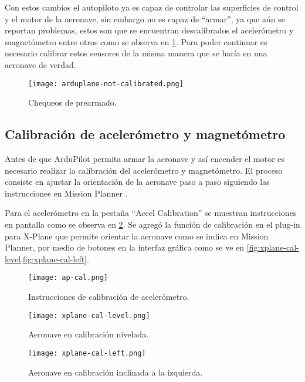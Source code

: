 Con estos cambios el autopiloto ya es capaz de controlar las superficies de control y el motor de la aeronave, sin embargo no es capaz de ``armar”, ya que aún se reportan problemas, estos son que se encuentran descalibrados el acelerómetro y magnetómetro entre otros como se observa en \cref{fig:arduplane-not-calibrated}. Para poder continuar es necesario calibrar estos sensores de la misma manera que se haría en una aeronave de verdad.

\begin{figure}[h]
    \centering
    \texttt{[image: arduplane-not-calibrated.png]}
    \caption{Chequeos de prearmado.}
    \label{fig:arduplane-not-calibrated}
\end{figure}

\subsection{Calibración de acelerómetro y magnetómetro}

Antes de que ArduPilot permita armar la aeronave y así encender el motor es necesario realizar la calibración del acelerómetro y magnetómetro. El proceso consiste en ajustar la orientación de la aeronave paso a paso siguiendo las instrucciones en Mission Planner \cite{arduplane-accelerometer}.

Para el acelerómetro en la pestaña ``Accel Calibration'' se muestran instrucciones en pantalla como se observa en \cref{fig:ap-cal}. Se agregó la función de calibración en el plug-in para X-Plane que permite orientar la aeronave como se indica en Mission Planner, por medio de botones en la interfaz gráfica como se ve en \cref{fig:xplane-cal-level,fig:xplane-cal-left}.

\begin{figure}[h]
    \centering
    \texttt{[image: ap-cal.png]}
    \caption{Instrucciones de calibración de acelerómetro.}
    \label{fig:ap-cal}
\end{figure}

\begin{figure}[h]
    \centering
    \texttt{[image: xplane-cal-level.png]}
    \caption{Aeronave en calibración nivelada.}
    \label{fig:xplane-cal-level}
\end{figure}

\begin{figure}[h]
    \centering
    \texttt{[image: xplane-cal-left.png]}
    \caption{Aeronave en calibración inclinada a la izquierda.}
    \label{fig:xplane-cal-left}
\end{figure}

